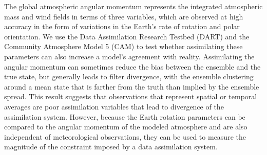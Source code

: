 The global atmospheric angular momentum represents the integrated atmospheric mass and wind fields in terms of three variables, which are observed at high accuracy in the form of variations in the Earth's rate of rotation and polar orientation. 
%
We use the Data Assimilation Research Testbed (DART) and the Community Atmosphere Model 5 (CAM) to test whether assimilating these parameters can also increase a model's agreement with reality. 
Assimilating the angular momentum can sometimes reduce the bias between the ensemble and the true state, but generally leads to filter divergence, with the ensemble clustering around a mean state that is farther from the truth than implied by the ensemble spread. 
This result suggests that observations that represent spatial or temporal averages are poor assimilation variables that lead to divergence of the assimilation system.  
%
However, because the Earth rotation parameters can be compared to the angular momentum of the modeled atmosphere and are also independent of meteorological observations, they can be used to measure 
the magnitude of the constraint imposed by a data assimilation system.
%
